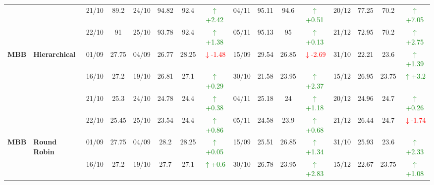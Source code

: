 \documentclass{ieeeaccess}
\begin{document}
{\begin{longtable}{llcc|cccc|cccc|cccc}
&
& 21/10 & 89.2 & 24/10 & 94.82 & 92.4 & \textcolor{green}{\(\uparrow\)+2.42} & 04/11 & 95.11 & 94.6 & \textcolor{green}{\(\uparrow\)+0.51} & 20/12 & 77.25 & 70.2 & \textcolor{green}{\(\uparrow\)+7.05} \\

&
& 22/10 & 91 & 25/10 & 93.78 & 92.4 & \textcolor{green}{\(\uparrow\)+1.38} & 05/11 & 95.13 & 95 & \textcolor{green}{\(\uparrow\)+0.13} & 21/12 & 72.95 & 70.2 & \textcolor{green}{\(\uparrow\)+2.75} \\
\midrule



\multirow{4}{*}{\textbf{MBB}} 
& \textbf{Hierarchical}
& 01/09 & 27.75 & 04/09 & 26.77 & 28.25 & \textcolor{red}{\(\downarrow\)-1.48} & 15/09 & 29.54 & 26.85 & \textcolor{red}{\(\downarrow\)-2.69} & 31/10 & 22.21 & 23.6 & \textcolor{green}{\(\uparrow\)+1.39} \\

&
& 16/10 & 27.2 & 19/10 & 26.81 & 27.1 & \textcolor{green}{\(\uparrow\)+0.29} & 30/10 & 21.58 & 23.95 & \textcolor{green}{\(\uparrow\)+2.37} & 15/12 & 26.95 & 23.75 & \textcolor{green}{\(\uparrow\)+3.2} \\

&
& 21/10 & 25.3 & 24/10 & 24.78 & 24.4 & \textcolor{green}{\(\uparrow\)+0.38} & 04/11 & 25.18 & 24 & \textcolor{green}{\(\uparrow\)+1.18} & 20/12 & 24.96 & 24.7 & \textcolor{green}{\(\uparrow\)+0.26} \\

&
& 22/10 & 25.45 & 25/10 & 23.54 & 24.4 & \textcolor{green}{\(\uparrow\)+0.86} & 05/11 & 24.58 & 23.9 & \textcolor{green}{\(\uparrow\)+0.68} & 21/12 & 26.44 & 24.7 & \textcolor{red}{\(\downarrow\)-1.74} \\
\midrule


\multirow{4}{*}{\textbf{MBB}} 
& \textbf{Round Robin}
& 01/09 & 27.75 & 04/09 & 28.2 & 28.25 & \textcolor{green}{\(\uparrow\)+0.05} & 15/09 & 25.51 & 26.85 & \textcolor{green}{\(\uparrow\)+1.34} & 31/10 & 25.93 & 23.6 & \textcolor{green}{\(\uparrow\)+2.33} \\

&
& 16/10 & 27.2 & 19/10 & 27.7 & 27.1 & \textcolor{green}{\(\uparrow\)+0.6} & 30/10 & 26.78 & 23.95 & \textcolor{green}{\(\uparrow\)+2.83} & 15/12 & 22.67 & 23.75 & \textcolor{green}{\(\uparrow\)+1.08} \\


\end{longtable}}
\end{document}
